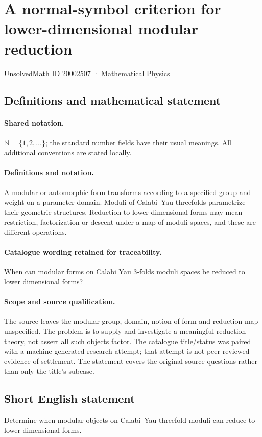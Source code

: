 \documentclass[11pt]{article}
\begin{document}
\setcounter{section}{20002506}
\section{A normal-symbol criterion for lower-dimensional modular reduction}\label{20002507}
{\small UnsolvedMath ID 20002507 · Mathematical Physics}
\subsection{Definitions and mathematical statement}

\paragraph{Shared notation.}$\mathbb N=\{1,2,\ldots\}$; the standard number fields have their usual meanings. All additional conventions are stated locally.


\paragraph{Definitions and notation.}A modular or automorphic form transforms according to a specified group and weight on a parameter domain. Moduli of Calabi--Yau threefolds parametrize their geometric structures. Reduction to lower-dimensional forms may mean restriction, factorization or descent under a map of moduli spaces, and these are different operations.

\paragraph{Catalogue wording retained for traceability.}
When can modular forms on Calabi Yau 3-folds moduli spaces be reduced to lower dimensional forms?
\paragraph{Scope and source qualification.}The source leaves the modular group, domain, notion of form and reduction map unspecified. The problem is to supply and investigate a meaningful reduction theory, not assert all such objects factor. The catalogue title/status was paired with a machine-generated research attempt; that attempt is not peer-reviewed evidence of settlement. The statement covers the original source questions rather than only the title’s subcase.
\subsection{Short English statement}
Determine when modular objects on Calabi–Yau threefold moduli can reduce to lower-dimensional forms.
\end{document}

